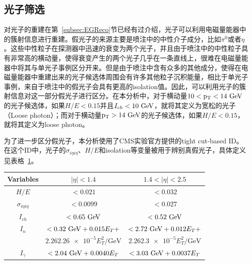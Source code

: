 \subsection{光子筛选}

对光子的重建在第~\ref{subsec:EGReco}节已经有过介绍，光子可以利用电磁量能器中的簇射信息进行重建。假光子的来源主要是喷注中的中性介子成分，比如$\pi^{0}$或者$\eta$。这些中性粒子在探测器中迅速的衰变为两个光子，并且由于喷注中的中性粒子具有非常高的横动量，使得衰变产生的两个光子几乎在一条直线上，很难在电磁量能器中将其与单光子事例区分开来。但是由于喷注中含有众多的其他成分，使得在电磁量能器中重建出来的光子候选体周围会有许多其他粒子沉积能量，相比于单光子事例，来自于喷注中的假光子会具有更高的isolation值。因此，可以利用光子的簇射信息对这一部分假光子进行区分。在本分析中，对于横动量$10<\pt<14\GeV$的光子候选体，如果$H/E<0.15$并且$I_{ch}<10\GeV$，就将其定义为宽松的光子（Loose photon）；而对于横动量$\pt>14\GeV$的光子候选体，如果$H/E<0.15$，就将其定义为loose photon。

为了进一步区分假光子，本分析使用了CMS实验官方提供的tight cut-based ID。在这个ID中，光子的$\sigma_{i\eta i\eta}$、$H/E$和isolation等变量被用于辨别真假光子，具体定义见表格~\ref{tab:tightPhotonID}。

\begin{table}[h]
    \begin{small}
    \begin{center}
    \begin{tabular}{ccc}
      \hline
      Variables         & $|\eta|<1.4$  & $1.4<|\eta|<2.5$               \\
      \hline
      $H/E$          & $<0.021$ & $<0.032$           \\
      $\sigma_{i\eta i\eta}$         & $<0.0099$ & $<0.027$      \\
      $I_{ch}$   & $<0.65\GeV$  & $<0.52\GeV$                     \\
      $I_{n}$     & $<0.32\GeV+0.015E_{T}+$  & $<2.72\GeV+0.012E_{T}+$      \\
              & $2.26\num{2.26e-5}E_{T}^{2}/\mathrm{GeV}$ & $2.26\num{2.3e-5}E_{T}^{2}/\mathrm{GeV}$ \\
      $I_{\gamma}$  & $<2.04\GeV+0.0040E_{T}$ & $<3.03\GeV+0.0037E_{T}$             \\
      \hline
    \end{tabular}
    \label{tab:tightPhotonID}
    \end{center}
    \end{small}
\end{table}

